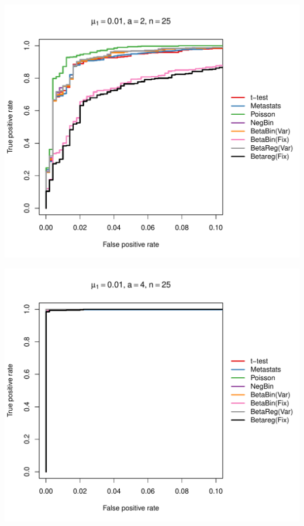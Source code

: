 \documentclass[12pt]{article}\usepackage{graphicx, color}
\makeatletter
\def\maxwidth{ %
  \ifdim\Gin@nat@width>\linewidth
    \linewidth
  \else
    \Gin@nat@width
  \fi
}
\newenvironment{knitrout}{}{} %
\makeatother
\begin{document}
\begin{knitrout}
{\centering \includegraphics[width=\maxwidth]{figure/rocs71} 

}




{\centering \includegraphics[width=\maxwidth]{figure/rocs72} 

}



\end{knitrout}
\end{document}
